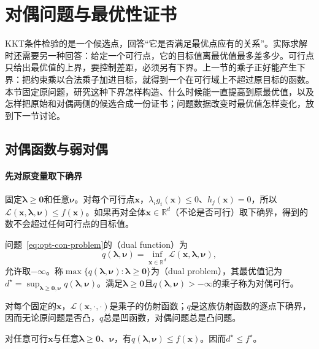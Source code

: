 \section{对偶问题与最优性证书}
\label{sec:opt-con-duality}

KKT条件检验的是一个候选点，回答“它是否满足最优点应有的关系”。实际求解时还需要另一种回答：给定一个可行点，它的目标值离最优值最多差多少。可行点只给出最优值的上界，要控制差距，必须另有下界。上一节的乘子正好能产生下界：把约束乘以合法乘子加进目标，就得到一个在可行域上不超过原目标的函数。本节固定原问题，研究这种下界怎样构造、什么时候能一直提高到原最优值，以及怎样把原始和对偶两侧的候选合成一份证书；问题数据改变时最优值怎样变化，放到下一节讨论。

\subsection{对偶函数与弱对偶}
\label{sec:opt-con-weak-duality}

\paragraph{先对原变量取下确界}
固定$\bm\lambda\geq\bm0$和任意$\bm\nu$。对每个可行点$\bm x$，$\lambda_ig_i(\bm x)\leq0$、$h_j(\bm x)=0$，所以$\mathcal L(\bm x,\bm\lambda,\bm\nu)\leq f(\bm x)$。如果再对全体$\bm x\in\mathbb R^d$（不论是否可行）取下确界，得到的数不会超过任何可行点的目标值。

\begin{definition}[对偶函数与对偶问题]
\label{def:opt-con-dual-function}
问题~\eqref{eq:opt-con-problem}的（dual function）为
\[
  q(\bm\lambda,\bm\nu)=\inf_{\bm x\in\mathbb R^d}\mathcal L(\bm x,\bm\lambda,\bm\nu),
\]
允许取$-\infty$。称$\max\{q(\bm\lambda,\bm\nu):\bm\lambda\geq\bm0\}$为（dual problem），其最优值记为$d^\star=\sup_{\bm\lambda\geq\bm0,\bm\nu}q(\bm\lambda,\bm\nu)$。满足$\bm\lambda\geq\bm0$且$q(\bm\lambda,\bm\nu)>-\infty$的乘子称为对偶可行。
\end{definition}

对每个固定的$\bm x$，$\mathcal L(\bm x,\cdot,\cdot)$是乘子的仿射函数；$q$是这族仿射函数的逐点下确界，因而无论原问题是否凸，$q$总是凹函数，对偶问题总是凸问题。

\begin{theorem}[弱对偶]
\label{thm:opt-con-weak-duality}
对任意可行$\bm x$与任意$\bm\lambda\geq\bm0$、$\bm\nu$，有$q(\bm\lambda,\bm\nu)\leq f(\bm x)$。因而$d^\star\leq f^\star$。
\end{theorem}

